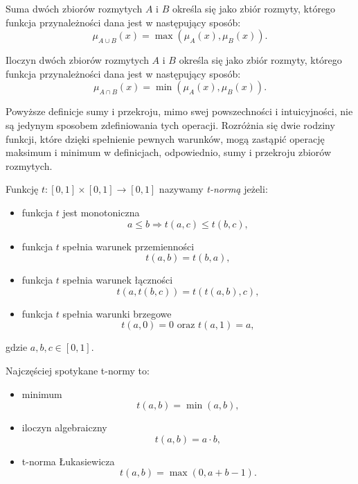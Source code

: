 \begin{definition}
Suma dwóch zbiorów rozmytych $A$ i $B$ określa się jako zbiór rozmyty, którego
funkcja przynależności dana jest w następujący sposób:
\begin{equation}
\mu_{A \cup B}(x) = \max(\mu_A(x), \mu_B(x)).
\end{equation}
\end{definition}

\begin{definition}
Iloczyn dwóch zbiorów rozmytych $A$ i $B$ określa się jako zbiór rozmyty,
którego funkcja przynależności dana jest w następujący sposób:
\begin{equation}
\mu_{A \cap B}(x) = \min(\mu_A(x), \mu_B(x)).
\end{equation}
\end{definition}

Powyższe definicje sumy i przekroju, mimo swej powszechności i intuicyjności,
nie są jedynym sposobem zdefiniowania tych operacji. Rozróżnia się dwie rodziny
funkcji, które dzięki spełnienie pewnych warunków, mogą zastąpić operację
maksimum i minimum w definicjach, odpowiednio, sumy i przekroju zbiorów
rozmytych.

\begin{definition}[t-norma]
Funkcję $t : [0,1] \times [0,1] \rightarrow [0,1]$ nazywamy \emph{t-normą}
jeżeli:
\begin{itemize}
  \item funkcja $t$ jest monotoniczna $$a \leq b \Rightarrow t(a,c) \leq
  t(b,c),$$
  \item funkcja $t$ spełnia warunek przemienności $$t(a,b) = t(b,a),$$
  \item funkcja $t$ spełnia warunek łączności $$t(a, t(b,c)) = t(t(a,b),c),$$
  \item funkcja $t$ spełnia warunki brzegowe $$t(a,0)=0 \textrm{ oraz }
  t(a,1)=a,$$
\end{itemize}
gdzie $a, b, c \in [0,1]$.
\end{definition}

Najczęściej spotykane t-normy to:
\begin{itemize}
  \item minimum $$t(a,b) = \min(a,b),$$
  \item iloczyn algebraiczny $$t(a,b) = a \cdot b,$$
  \item t-norma Łukasiewicza $$t(a,b) = \max(0, a+b-1).$$
\end{itemize}


